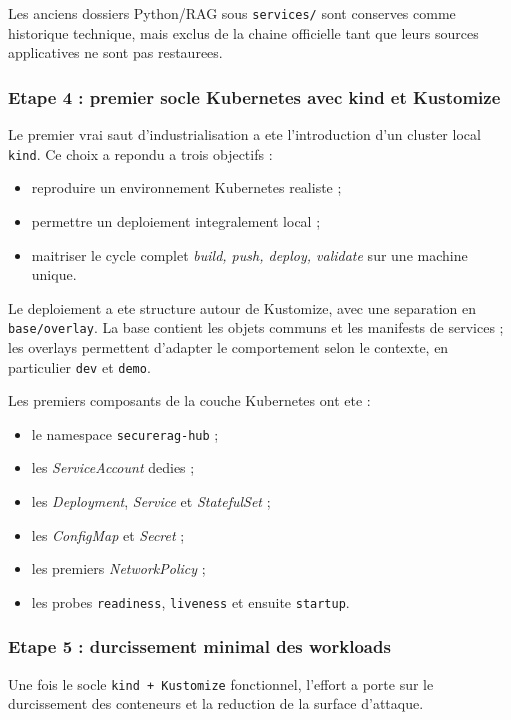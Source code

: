 Les anciens dossiers Python/RAG sous \texttt{services/} sont conserves comme historique technique, mais exclus de la chaine officielle tant que leurs sources applicatives ne sont pas restaurees.

\subsubsection{Etape 4 : premier socle Kubernetes avec kind et Kustomize}

Le premier vrai saut d'industrialisation a ete l'introduction d'un cluster local \texttt{kind}. Ce choix a repondu a trois objectifs :

\begin{itemize}
  \item reproduire un environnement Kubernetes realiste ;
  \item permettre un deploiement integralement local ;
  \item maitriser le cycle complet \textit{build, push, deploy, validate} sur une machine unique.
\end{itemize}

Le deploiement a ete structure autour de Kustomize, avec une separation en \texttt{base/overlay}. La base contient les objets communs et les manifests de services ; les overlays permettent d'adapter le comportement selon le contexte, en particulier \texttt{dev} et \texttt{demo}.

Les premiers composants de la couche Kubernetes ont ete :

\begin{itemize}
  \item le namespace \texttt{securerag-hub} ;
  \item les \textit{ServiceAccount} dedies ;
  \item les \textit{Deployment}, \textit{Service} et \textit{StatefulSet} ;
  \item les \textit{ConfigMap} et \textit{Secret} ;
  \item les premiers \textit{NetworkPolicy} ;
  \item les probes \texttt{readiness}, \texttt{liveness} et ensuite \texttt{startup}.
\end{itemize}

\subsubsection{Etape 5 : durcissement minimal des workloads}

Une fois le socle \texttt{kind + Kustomize} fonctionnel, l'effort a porte sur le durcissement des conteneurs et la reduction de la surface d'attaque.

